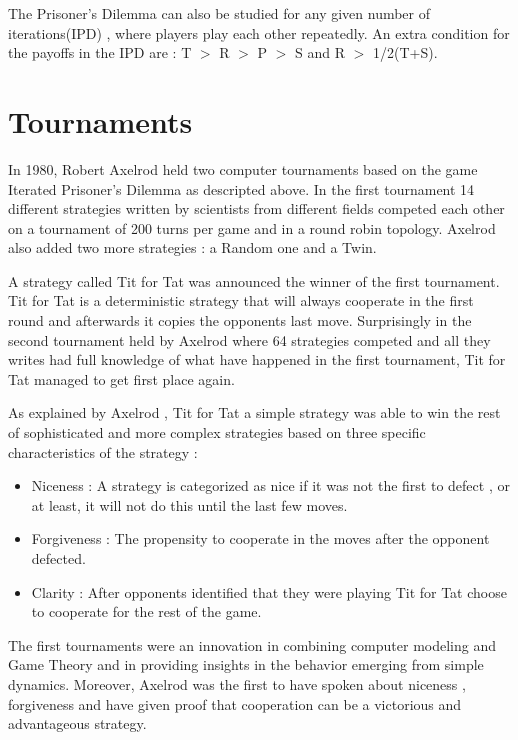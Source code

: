 The Prisoner’s Dilemma can also be studied for any given number of iterations(IPD)
, where players play each other repeatedly. An extra condition for the payoffs
in the IPD are : T \(>\) R \(>\) P \(>\) S and R \(>\) 1/2(T+S).

\section{Tournaments}

In 1980, Robert Axelrod held two computer tournaments based on the game Iterated
Prisoner's Dilemma as descripted above. In the first tournament 14 different
strategies written by scientists from different fields competed each other on a
tournament of 200 turns per game and in a round robin topology. Axelrod also added
two more strategies : a Random one and a Twin.

A strategy called Tit for Tat was announced the winner of the first tournament.
Tit for Tat is a deterministic strategy that will always cooperate in the first
round and afterwards it copies the opponents last move. Surprisingly in the second
tournament held by Axelrod \parencite{Axelrod1980a} where 64 strategies competed and all they
writes had full knowledge of what have happened in the first tournament, Tit
for Tat managed to get first place again.

As explained by Axelrod \parencite{Axelrod1980b}, Tit for Tat a simple strategy was able to
win the rest of sophisticated and more complex strategies based on three specific
characteristics of the strategy :
\begin{itemize}
  \item Niceness :  A strategy is categorized as nice if it was not the
                    first to defect , or at least, it will not do this until
                    the last few moves.
  \item Forgiveness : The propensity to cooperate in the moves after the
                      opponent defected.
  \item  Clarity : After opponents identified that they were playing Tit for Tat
                  choose to cooperate for the rest of the game.
\end{itemize}

The first tournaments were an innovation in combining computer modeling and
Game Theory and in providing insights in the behavior emerging from simple dynamics.
Moreover, Axelrod was the first to have spoken about niceness , forgiveness and have given proof
that cooperation can be a victorious and advantageous strategy.

